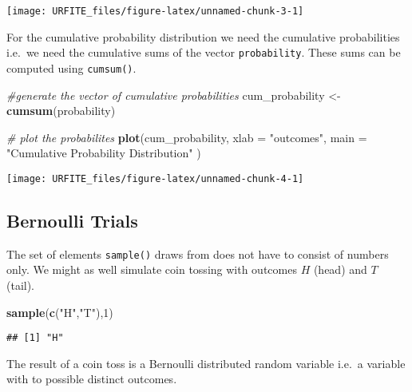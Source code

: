 \documentclass[]{book}
\newenvironment{Shaded}{\begin{snugshade}}{\end{snugshade}}
\newcommand{\KeywordTok}[1]{\textcolor[rgb]{0.13,0.29,0.53}{\textbf{#1}}}
\newcommand{\DataTypeTok}[1]{\textcolor[rgb]{0.13,0.29,0.53}{#1}}
\newcommand{\DecValTok}[1]{\textcolor[rgb]{0.00,0.00,0.81}{#1}}
\newcommand{\StringTok}[1]{\textcolor[rgb]{0.31,0.60,0.02}{#1}}
\newcommand{\CommentTok}[1]{\textcolor[rgb]{0.56,0.35,0.01}{\textit{#1}}}
\newcommand{\NormalTok}[1]{#1}
\theoremstyle{definition}
\theoremstyle{definition}
\theoremstyle{definition}
\theoremstyle{remark}
\begin{document}
\begin{center}\texttt{[image: URFITE\_files/figure-latex/unnamed-chunk-3-1]} \end{center}

For the cumulative probability distribution we need the cumulative
probabilities i.e.~we need the cumulative sums of the vector
\texttt{probability}. These sums can be computed using
\texttt{cumsum()}.

\begin{Shaded}
\begin{Highlighting}[]
\CommentTok{#generate the vector of cumulative probabilities }
\NormalTok{cum_probability <-}\StringTok{ }\KeywordTok{cumsum}\NormalTok{(probability) }

\CommentTok{# plot the probabilites }
\KeywordTok{plot}\NormalTok{(cum_probability, }
     \DataTypeTok{xlab =} \StringTok{"outcomes"}\NormalTok{, }
     \DataTypeTok{main =} \StringTok{"Cumulative Probability Distribution"}
\NormalTok{     ) }
\end{Highlighting}
\end{Shaded}

\begin{center}\texttt{[image: URFITE\_files/figure-latex/unnamed-chunk-4-1]} \end{center}

\subsection*{Bernoulli Trials}\label{bernoulli-trials}

The set of elements \texttt{sample()} draws from does not have to
consist of numbers only. We might as well simulate coin tossing with
outcomes \(H\) (head) and \(T\) (tail).

\begin{Shaded}
\begin{Highlighting}[]
\KeywordTok{sample}\NormalTok{(}\KeywordTok{c}\NormalTok{(}\StringTok{"H"}\NormalTok{,}\StringTok{"T"}\NormalTok{),}\DecValTok{1}\NormalTok{) }
\end{Highlighting}
\end{Shaded}

\begin{verbatim}
## [1] "H"
\end{verbatim}

The result of a coin toss is a Bernoulli distributed random variable
i.e.~a variable with to possible distinct outcomes.
\end{document}
